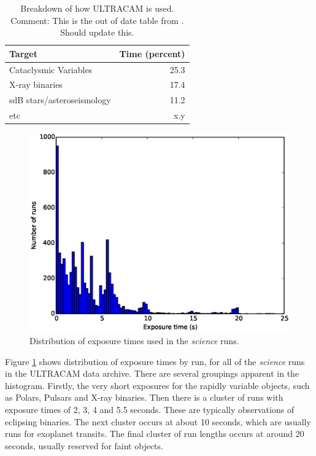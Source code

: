 \begin{table}
  \begin{center}
	\begin{tabular}{|l|r|}
		\hline
		Target & Time (percent) \\
		\hline
		Cataclysmic Variables & 25.3 \\
		X-ray binaries & 17.4 \\
		sdB stars/asteroseismology & 11.2 \\
		etc & x.y \\
		\hline
	\end{tabular}
  \end{center}
\label{tab:breakdown}
\caption{Breakdown of how ULTRACAM is used. Comment: This is the out of date table from \cite{dhillon07}. Should update this.}
\end{table}


\begin{figure}[!h]
  \centering
  \includegraphics[width=120mm]{images/cadences_hist0-25.eps}
  \caption{Distribution of exposure times used in the \emph{science} runs.}
  \label{fig:cadences}
\end{figure}

Figure \ref{fig:cadences} shows  distribution of exposure times by run, for all of the \emph{science} runs in the ULTRACAM data archive. There are several groupings apparent in the histogram. Firstly, the very short exposures for the rapidly variable objects, such as Polars, Pulsars and X-ray binaries. Then there is a cluster of runs with exposure times of 2, 3, 4 and 5.5 seconds. These are typically observations of eclipsing binaries. The next cluster occurs at about 10 seconds, which are usually runs for exoplanet transits. The final cluster of run lengths occurs at around 20 seconds, usually reserved for faint objects.

